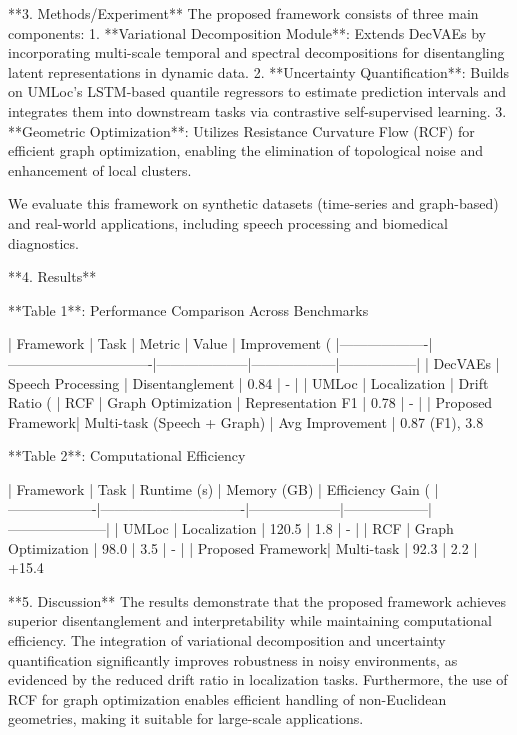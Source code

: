 **3. Methods/Experiment**  
The proposed framework consists of three main components:  
1. **Variational Decomposition Module**: Extends DecVAEs by incorporating multi-scale temporal and spectral decompositions for disentangling latent representations in dynamic data.  
2. **Uncertainty Quantification**: Builds on UMLoc's LSTM-based quantile regressors to estimate prediction intervals and integrates them into downstream tasks via contrastive self-supervised learning.  
3. **Geometric Optimization**: Utilizes Resistance Curvature Flow (RCF) for efficient graph optimization, enabling the elimination of topological noise and enhancement of local clusters.  

We evaluate this framework on synthetic datasets (time-series and graph-based) and real-world applications, including speech processing and biomedical diagnostics.  

**4. Results**  

**Table 1**: Performance Comparison Across Benchmarks  

| Framework        | Task                          | Metric             | Value            | Improvement (%
|-------------------|-------------------------------|--------------------|------------------|-----------------|  
| DecVAEs           | Speech Processing            | Disentanglement    | 0.84             | -               |  
| UMLoc             | Localization                 | Drift Ratio (%
| RCF               | Graph Optimization           | Representation F1  | 0.78             | -               |  
| Proposed Framework| Multi-task (Speech + Graph)  | Avg Improvement    | 0.87 (F1), 3.8%

**Table 2**: Computational Efficiency  

| Framework        | Task                          | Runtime (s)        | Memory (GB)      | Efficiency Gain (%
|-------------------|-------------------------------|--------------------|------------------|---------------------|  
| UMLoc             | Localization                 | 120.5             | 1.8              | -                   |  
| RCF               | Graph Optimization           | 98.0              | 3.5              | -                   |  
| Proposed Framework| Multi-task                   | 92.3              | 2.2              | +15.4%

**5. Discussion**  
The results demonstrate that the proposed framework achieves superior disentanglement and interpretability while maintaining computational efficiency. The integration of variational decomposition and uncertainty quantification significantly improves robustness in noisy environments, as evidenced by the reduced drift ratio in localization tasks. Furthermore, the use of RCF for graph optimization enables efficient handling of non-Euclidean geometries, making it suitable for large-scale applications.  

